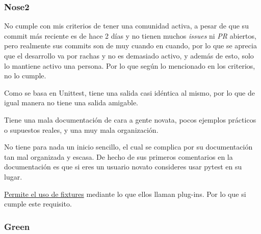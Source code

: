 \subsubsection{Nose2}

\begin{todolist}
    \item No cumple con mis criterios de tener una comunidad activa, a pesar de
    que su commit más reciente es de hace 2 días y no tienen muchos
    \emph{issues} ni \emph{PR} abiertos, pero realmente sus commits son de muy
    cuando en cuando, por lo que se aprecia que el desarrollo va por rachas y no
    es demasiado activo, y además de esto, solo lo mantiene activo una persona.
    Por lo que según lo mencionado en los criterios, no lo cumple. 
    \item Como se basa en Unittest, tiene una salida casi idéntica al mismo, por
    lo que de igual manera no tiene una salida amigable. 
    \item Tiene una mala documentación de cara a gente novata, pocos ejemplos
    prácticos o supuestos reales, y una muy mala organización.
    \item No tiene para nada un inicio sencillo, el cual se complica por su
    documentación tan mal organizada y escasa. De hecho de sus primeros
    comentarios en la documentación es que si eres un usuario novato consideres
    usar pytest en su lugar.
    \item[\xcmark]
    \href{https://docs.nose2.io/en/latest/plugins/layers.html?highlight=fixtures#organizing-test-fixtures-into-layers}{Permite
    el uso de fixtures} mediante lo que ellos llaman plug-ins. Por lo que si
    cumple este requisito. 
\end{todolist}

\subsubsection{Green}

